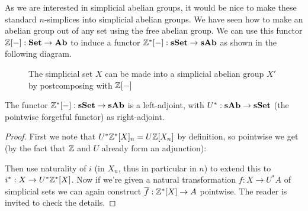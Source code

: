 As we are interested in simplicial abelian groups, it would be nice to make these standard $n$-simplices into simplicial abelian groups. We have seen how to make an abelian group out of any set using the free abelian group. We can use this functor $\mathbb{Z}[-] : \mathbf{Set} \to \mathbf{Ab}$ to induce a functor $\mathbb{Z}^\ast[-] : \mathbf{sSet} \to \mathbf{sAb}$ as shown in the following diagram.
\begin{figure}[h!]
	\caption{The simplicial set $X$ can be made into a simplicial abelian group $X'$ by postcomposing with $\mathbb{Z}[-]$}
	\label{fig:diagram_Z}
\end{figure}
\begin{lemma}
	The functor $\mathbb{Z}^\ast[-] : \mathbf{sSet} \to \mathbf{sAb}$ is a left-adjoint, with $U^\ast: \mathbf{sAb} \to \mathbf{sSet}$ (the pointwise forgetful functor) as right-adjoint.
\end{lemma}
\begin{proof}
	First we note that $U^\ast \mathbb{Z}^\ast [X]_n = U\mathbb{Z}[X_n]$ by definition, so pointwise we get (by the fact that $\mathbb{Z}$ and $U$ already form an adjunction):
\begin{center}
\end{center}
	Then use naturality of $i$ (in $X_n$, thus in particular in $n$) to extend this to $i^\ast : X \to U^\ast \mathbb{Z}^\ast [X]$. Now if we're given a natural transformation $f: X \to U^\ast A$ of simplicial sets we can again construct $\overline{f}: \mathbb{Z}^\ast[X] \to A$ pointwise. The reader is invited to check the details.
\end{proof}

